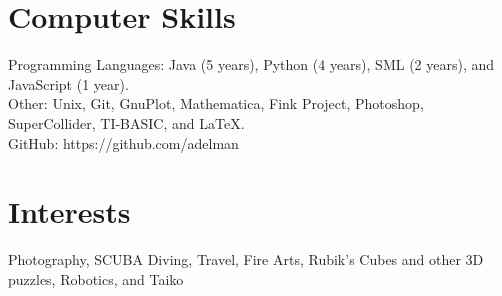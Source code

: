 \documentclass[11pt]{res} %
\begin{document}
\begin{resume}
 
\section{Computer Skills} 
Programming Languages: Java (5 years), Python (4 years), SML (2 years), and
JavaScript (1 year).\\
Other: Unix, Git, GnuPlot, Mathematica, Fink Project, Photoshop, SuperCollider,
TI-BASIC, and \LaTeX.\\
GitHub: https://github.com/adelman

\section{Interests} 
Photography, SCUBA Diving, Travel, Fire Arts, Rubik's Cubes and other 3D
puzzles, Robotics, and Taiko 

\end{resume}
\end{document}
